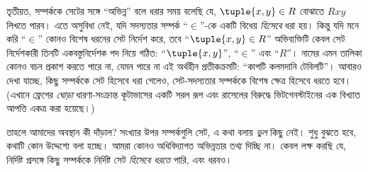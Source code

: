 \documentclass[../../../include/open-logic-section]{subfiles}
\begin{document}
তৃতীয়ত, সম্পর্ককে সেটের সঙ্গে ``অভিন্ন'' বলে ধরার সময় বলেছি যে,
$\tuple{x,y} \in R$ বোঝাতে $Rxy$ লিখতে পারব। এতে অসুবিধা নেই,
যদি সদস্যতার সম্পর্ক ``$\in$''-কে একটি বিধেয় \emph{হিসেবে} ধরা হয়।
কিন্তু যদি মনে করি ``$\in$'' কোনও বিশেষ ধরনের সেট নির্দেশ করে,
তবে ``$\tuple{x,y} \in R$'' অভিব্যক্তিটি কেবল সেট নির্দেশকারী তিনটি
একবস্তুনির্দেশক পদ নিয়ে গঠিত: ``$\tuple{x,y}$'', ``$\in$'' এবং
``$R$''। নামের এমন তালিকা কোনও বচন প্রকাশ করতে পারে না,
যেমন পারে না এই অর্থহীন প্রতীকক্রমটি: ``কাপটি কলমদানি টেবিলটি''।
আবারও দেখা যাচ্ছে, কিছু সম্পর্ককে সেট হিসেবে ধরা গেলেও,
সেট-সদস্যতার সম্পর্ককে বিশেষ ক্ষেত্র হিসেবে ধরতে হবে। (এখানে
ফ্রেগের \emph{ঘোড়া} ধারণা-সংক্রান্ত কূটাভাসের একটি সরল রূপ এবং
রাসেলের বিরুদ্ধে ভিটগেনস্টাইনের এক বিখ্যাত আপত্তি একত্র করা হয়েছে।)

তাহলে আমাদের অবস্থান কী দাঁড়াল? সংখ্যার উপর সম্পর্কগুলি সেট,
এ কথা বলায় \emph{ভুল} কিছু নেই। শুধু বুঝতে হবে, কথাটি কোন
উদ্দেশ্যে বলা হচ্ছে। আমরা কোনও অধিবিদ্যাগত অভিন্নতার তথ্য দিচ্ছি না।
কেবল লক্ষ করছি যে, নির্দিষ্ট প্রসঙ্গে কিছু সম্পর্ককে নির্দিষ্ট সেট
\emph{হিসেবে ধরতে} পারি, এবং ধরবও।
\end{document}
